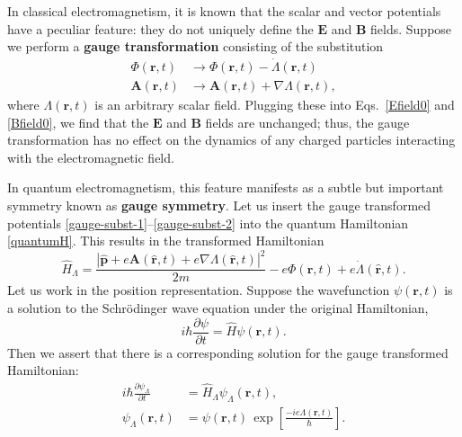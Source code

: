 \documentclass[prx,12pt]{revtex4-2}
\begin{document}
In classical electromagnetism, it is known that the scalar and vector
potentials have a peculiar feature: they do not uniquely define the
$\mathbf{E}$ and $\mathbf{B}$ fields.  Suppose we perform a
\textbf{gauge transformation} consisting of the substitution
\begin{align}
  \Phi(\mathbf{r},t) &\rightarrow \Phi(\mathbf{r},t) - \dot{\Lambda}(\mathbf{r},t) \label{gauge-subst-1} \\
  \mathbf{A}(\mathbf{r},t) &\rightarrow
  \mathbf{A}(\mathbf{r},t) + \nabla{\Lambda}(\mathbf{r},t),
  \label{gauge-subst-2}
\end{align}
where $\Lambda(\mathbf{r},t)$ is an arbitrary scalar field.  Plugging
these into Eqs.~\eqref{Efield0} and \eqref{Bfield0}, we find that the
$\mathbf{E}$ and $\mathbf{B}$ fields are unchanged; thus, the gauge
transformation has no effect on the dynamics of any charged particles
interacting with the electromagnetic field.

In quantum electromagnetism, this feature manifests as a subtle but
important symmetry known as \textbf{gauge symmetry}.  Let us insert
the gauge transformed potentials
\eqref{gauge-subst-1}--\eqref{gauge-subst-2} into the quantum
Hamiltonian \eqref{quantumH}.  This results in the transformed
Hamiltonian
\begin{equation}
  \hat{H}_\Lambda
  = \frac{|\hat{\mathbf{p}}+e\mathbf{A}(\hat{\mathbf{r}},t) + e\nabla\Lambda(\hat{\mathbf{r}},t)|^2}{2m}
  - e\Phi(\hat{\mathbf{r}},t) + e\dot{\Lambda}(\hat{\mathbf{r}},t).
\end{equation}
Let us work in the position representation.  Suppose the wavefunction
$\psi(\mathbf{r},t)$ is a solution to the Schr\"odinger wave equation
under the original Hamiltonian,
\begin{equation}
  i\hbar\frac{\partial\psi}{\partial t} =
  \hat{H} \psi(\mathbf{r},t).
  \label{origschrod}
\end{equation}
Then we assert that there is a corresponding solution for the gauge
transformed Hamiltonian:
\begin{align}
  i\hbar\frac{\partial \psi_\Lambda}{\partial t} &=
  \hat{H}_\Lambda \psi_\Lambda(\mathbf{r},t),
  \label{gaugeschrod} \\
  \psi_\Lambda(\mathbf{r},t) &=
  \psi(\mathbf{r}, t)\, \exp\left[\frac{-ie\Lambda(\mathbf{r}, t)}{\hbar}\right].
\end{align}
\end{document}
